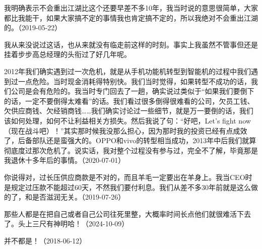 我明确表示不会重出江湖比这个还要早差不多10年，我当时说的意思很简单，大家都比我能干，如果大家搞不定的事情我也肯定搞不定的，所以我绝对不会重出江湖的。（2019-05-22）


我从来没说过这话，也从来就没有临走前这样的时刻。事实上我虽然不管事但还是挂着步步高总经理的头衔过了好几年呢。

2012年我们确实遇到过一次危机，就是从手机功能机转型到智能机的过程中我们遇到过一点危险。当时现金消耗得特别快。我们当时觉得，如果转型不成功的话，我们公司是会有危险的。我当时专门回去了一趟，确实说过类似于“如果我们要倒下的话，一定不要倒得太难看”的话。我们看过很多倒得很难看的公司，欠员工钱、欠供应商钱、欠经销商钱……我们确实讨论过一些细节，就是万一要倒的话，我们该如何处理，如何不让利益相关方损失。然后我说了句：“好吧，Let's fight now（现在战斗吧）！”其实那时候我没那么担心，因为那时我的投资已经有点成效了，后备部队还是蛮强大的。OPPO和vivo的转型相当成功，2013年中后我们就算彻底度过那次危机了。说实话，我对整个过程没有参与过，完全不了解，毕竟那是我退休十多年后的事情。（2020-07-01）


你说得对，过长压供应商款是不对的，而且羊毛一定要出在羊身上。我当CEO时是规定过压款不能超过60天，不然我们要付利息。我们从差不多30年前就是这么做的了，和是否滋润无关。（2019-07-26）


那些人都是在把自己或者自己公司往死里整，大概率时间长点他们就很难活下去了。头上三尺有神明哈！（2024-10-09）



并不都是！（2018-06-12）


